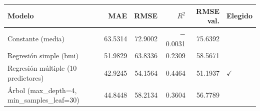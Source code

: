\begin{tabular}{lrrrrl}
\toprule
Modelo & MAE & RMSE & $R^2$ & RMSE val. & Elegido \\
\midrule
Constante (media) & 63.5314 & 72.9002 & $-$0.0031 & 75.6392 &  \\
Regresión simple (bmi) & 51.9829 & 63.8336 & 0.2309 & 58.5671 &  \\
Regresión múltiple (10 predictores) & 42.9245 & 54.1564 & 0.4464 & 51.1937 & $\checkmark$ \\
Árbol (max\_depth=4, min\_samples\_leaf=30) & 44.8448 & 58.2134 & 0.3604 & 56.7789 &  \\
\bottomrule
\end{tabular}
